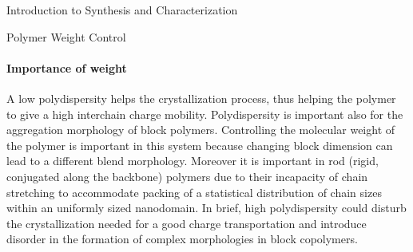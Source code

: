 \begin{section}{Introduction to Synthesis and Characterization}
\begin{subsection}{Polymer Weight Control}
\paragraph{Importance of weight} A low polydispersity helps the crystallization process, thus helping the polymer to give a high interchain charge mobility. Polydispersity is important also for the aggregation morphology of block polymers. Controlling the molecular weight of the polymer is important in this system because changing block dimension can lead to a different blend morphology. 
Moreover it is important in rod (rigid, conjugated along the backbone) polymers due to their incapacity of chain stretching to accommodate packing of a statistical distribution of chain sizes within an uniformly sized nano\-domain. In brief, high polydispersity could disturb the crystallization needed for a good charge transportation and introduce disorder in the formation of complex morphologies in block copolymers.


\end{subsection}
\end{section}

